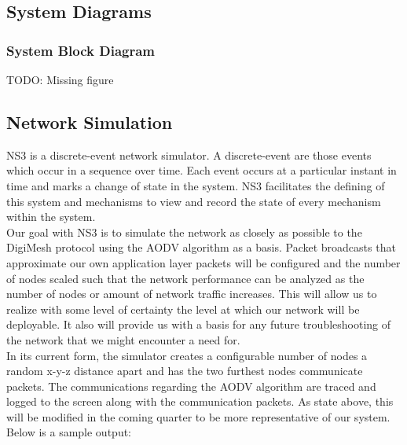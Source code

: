 \documentclass[journal,compsoc]{IEEEtran}
\begin{document}
\subsection{System Diagrams}

\subsubsection{System Block Diagram}

TODO: Missing figure

\subsection{Network Simulation}

NS3 is a discrete-event network simulator. A discrete-event are those events which occur in a sequence over time. Each event occurs at a particular instant in time and marks a change of state in the system. NS3 facilitates the defining of this system and mechanisms to view and record the state of every mechanism within the system.\\

\noindent Our goal with NS3 is to simulate the network as closely as possible to the DigiMesh protocol using the AODV algorithm as a basis. Packet broadcasts that approximate our own application layer packets will be configured and the number of nodes scaled such that the network performance can be analyzed as the number of nodes or amount of network traffic increases. This will allow us to realize with some level of certainty the level at which our network will be deployable. It also will provide us with a basis for any future troubleshooting of the network that we might encounter a need for.\\

\noindent In its current form, the simulator creates a configurable number of nodes a random x-y-z distance apart and has the two furthest nodes communicate packets. The communications regarding the AODV algorithm are traced and logged to the screen along with the communication packets. As state above, this will be modified in the coming quarter to be more representative of our system.\\

\noindent Below is a sample output:
\end{document}

